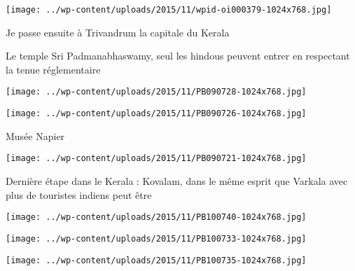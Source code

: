  

 

\begin{center} \texttt{[image: ../wp-content/uploads/2015/11/wpid-oi000379-1024x768.jpg]} \end{center}

 

 Je passe ensuite à Trivandrum la capitale du Kerala 

 Le temple Sri Padmanabhaswamy, seul les hindous peuvent entrer en respectant la tenue réglementaire 

 

\begin{center} \texttt{[image: ../wp-content/uploads/2015/11/PB090728-1024x768.jpg]} \end{center}

 

 

\begin{center} \texttt{[image: ../wp-content/uploads/2015/11/PB090726-1024x768.jpg]} \end{center}

 

 Musée Napier 

 

\begin{center} \texttt{[image: ../wp-content/uploads/2015/11/PB090721-1024x768.jpg]} \end{center}

 

 Dernière étape dans le Kerala : Kovalam, dans le même esprit que Varkala avec plus de touristes indiens peut être 

 

\begin{center} \texttt{[image: ../wp-content/uploads/2015/11/PB100740-1024x768.jpg]} \end{center}

 

 

\begin{center} \texttt{[image: ../wp-content/uploads/2015/11/PB100733-1024x768.jpg]} \end{center}

 

 

\begin{center} \texttt{[image: ../wp-content/uploads/2015/11/PB100735-1024x768.jpg]} \end{center}

